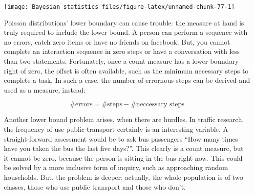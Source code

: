 \documentclass[]{svmono}
\newenvironment{Shaded}{\begin{snugshade}}{\end{snugshade}}
\newcommand{\KeywordTok}[1]{\textcolor[rgb]{0.13,0.29,0.53}{\textbf{#1}}}
\newcommand{\DataTypeTok}[1]{\textcolor[rgb]{0.13,0.29,0.53}{#1}}
\newcommand{\DecValTok}[1]{\textcolor[rgb]{0.00,0.00,0.81}{#1}}
\newcommand{\StringTok}[1]{\textcolor[rgb]{0.31,0.60,0.02}{#1}}
\newcommand{\OperatorTok}[1]{\textcolor[rgb]{0.81,0.36,0.00}{\textbf{#1}}}
\newcommand{\AlertTok}[1]{\textcolor[rgb]{0.94,0.16,0.16}{#1}}
\newcommand{\NormalTok}[1]{#1}
\begin{document}
\begin{Shaded}
\end{Shaded}

\texttt{[image: Bayesian\_statistics\_files/figure-latex/unnamed-chunk-77-1]}

Poisson distributions' lower boundary can cause trouble: the measure at
hand is truly required to include the lower bound. A person can perform
a sequence with no errors, catch zero items or have no friends on
facebook. But, you cannot complete an interaction sequence in zero steps
or have a conversation with less than two statements. Fortunately, once
a count measure has a lower boundary right of zero, the offset is often
available, such as the minimum necessary steps to complete a task. In
such a case, the number of errornous steps can be derived and used as a
measure, instead:

\[
\textrm{\#errors} = \textrm{\#steps} - \textrm{\#neccessary steps}
\]

Another lower bound problem arises, when there are hurdles. In traffic
research, the frequency of use public transport certainly is an
interesting variable. A straight-forward assessment would be to ask bus
passengers ``How many times have you taken the bus the last five
days?''. This clearly is a count measure, but it cannot be zero, because
the person is sitting in the bus right now. This could be solved by a
more inclusive form of inquiry, such as approaching random households.
But, the problem is deeper: actually, the whole population is of two
classes, those who use public transport and those who don't.
\end{document}
